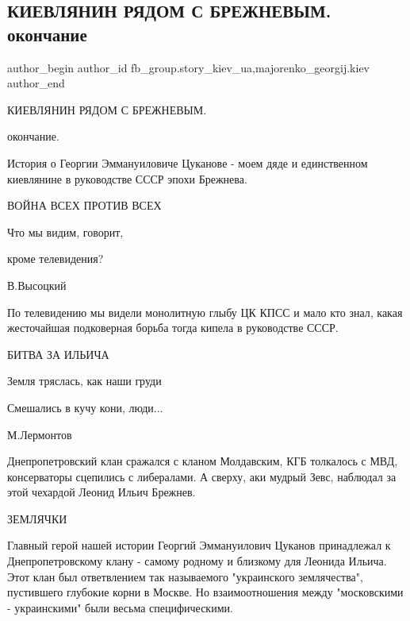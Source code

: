  
 
 
 
 
 
\subsection{КИЕВЛЯНИН РЯДОМ С БРЕЖНЕВЫМ. окончание}
\label{sec:12_10_2021.fb.fb_group.story_kiev_ua.1.kievljanin_brezhnev_okonchanie}
 
\ifcmt
 author_begin
   author_id fb_group.story_kiev_ua,majorenko_georgij.kiev
 author_end
\fi

КИЕВЛЯНИН РЯДОМ С БРЕЖНЕВЫМ. 

окончание.

История о Георгии Эммануиловиче Цуканове - моем дяде и единственном киевлянине
в руководстве СССР эпохи Брежнева.

ВОЙНА ВСЕХ ПРОТИВ ВСЕХ

Что мы видим, говорит,

кроме телевидения?

В.Высоцкий

По телевидению мы видели монолитную глыбу ЦК КПСС и мало кто знал, какая
жесточайшая подковерная борьба тогда кипела в руководстве СССР.

БИТВА ЗА ИЛЬИЧА

Земля тряслась, как наши груди

Смешались в кучу кони, люди...

М.Лермонтов

Днепропетровский клан сражался с кланом Молдавским, КГБ толкалось с МВД,
консерваторы сцепились с либералами. А сверху, аки мудрый Зевс, наблюдал за
этой чехардой Леонид Ильич Брежнев.

ЗЕМЛЯЧКИ

Главный герой нашей истории Георгий Эммануилович Цуканов принадлежал к
Днепропетровскому клану - самому родному и близкому для Леонида Ильича. Этот
клан был ответвлением так называемого "украинского землячества", пустившего
глубокие корни в Москве. Но взаимоотношения между "московскими - украинскими"
были весьма специфическими.

